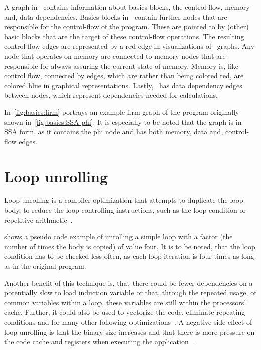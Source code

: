 A graph in \libFIRM~contains information about basics blocks, the control-flow, memory and, data dependencies.
Basics blocks in \libFIRM~contain further nodes that are responsible for the control-flow of the program.
These are pointed to by (other) basic blocks that are the target of these control-flow operations.
The resulting control-flow edges are represented by a red edge in visualizations of \libFIRM~graphs.
Any node that operates on memory are connected to memory nodes that are responsible for always assuring the current state of memory.
Memory is, like control flow, connected by edges, which are rather than being colored red, are colored blue in graphical representations.
Lastly, \libFIRM~has data dependency edges between nodes, which represent dependencies needed for calculations.

In~\cref{fig:basics:firm} portrays an example firm graph of the program originally shown in~\cref{fig:basics:SSA-phi}.
It is especially to be noted that the graph is in SSA form, as it contains the phi node and has both memory, data and, control-flow edges.



\section{Loop unrolling}\label{sec:basics:unrolling}

Loop unrolling is a compiler optimization that attempts to duplicate the loop body, to reduce the loop controlling instructions, such as the loop condition or repetitive arithmetic~\cite{aho_ullman_1979}.

 shows a pseudo code example of unrolling a simple loop with a factor (the number of times the body is copied) of value four.
It is to be noted, that the loop condition has to be checked less often, as each loop iteration is four times as long as in the original program.

Another benefit of this technique is, that there could be fewer dependencies on a potentially slow to load induction variable or that, through the repeated usage, of common variables within a loop, these variables are still within the processors' cache.
Further, it could also be used to vectorize the code, eliminate repeating conditions and for many other following optimizations~\cite{fog_2018}.
A negative side effect of loop unrolling is that the binary size increases and that there is more pressure on the code cache and registers when executing the application~\cite{Sarkar2001}.

